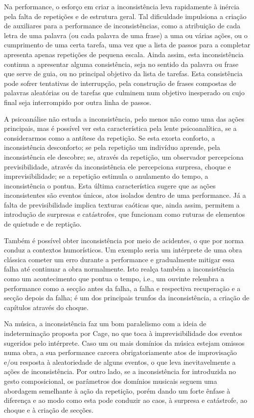\documentclass[../main.tex]{subfiles}
\begin{document}
Na performance, o esforço em criar a inconsistência leva rapidamente à inércia pela falta de repetições e de estrutura geral. Tal dificuldade impulsiona a criação de auxiliares para a performance de inconsistências, como a atribuição de cada letra de uma palavra (ou cada palavra de uma frase) a uma ou várias ações, ou o cumprimento de uma certa tarefa, uma vez que a lista de passos para a completar apresenta apenas repetições de pequena escala. Ainda assim, esta inconsistência continua a apresentar alguma consistência, seja no sentido da palavra ou frase que serve de guia, ou no principal objetivo da lista de tarefas. Esta consistência pode sofrer tentativas de interrupção, pela construção de frases compostas de palavras aleatórias ou de tarefas que culminem num objetivo inesperado ou cujo final seja interrompido por outra linha de passos.

A psicoanálise não estuda a inconsistência, pelo menos não como uma das ações principais, mas é possível ver esta característica pela lente psicoanalítica, se a considerarmos como a antítese da repetição. Se esta exorta conforto, a inconsistência desconforto; se pela repetição um indivíduo aprende, pela inconsistência ele descobre; se, através da repetição, um observador percepciona previsibilidade, através da inconsistência ele percepciona surpresa, choque e imprevisibilidade; se a repetição estimula o anulamento do tempo, a inconsistência o pontua. Esta última característica sugere que as ações inconsistentes são eventos únicos, atos isolados dentro de uma performance. Já a falta de previsibilidade implica texturas caóticas que, ainda assim, permitem a introdução de surpresas e catástrofes, que funcionam como ruturas de elementos de quietude e de reptição.

Também é possível obter inconsistência por meio de acidentes, o que por norma conduz a contextos humorísticos. Um exemplo seria um intérprete de uma obra clássica cometer um erro durante a performance e gradualmente mitigar essa falha até continuar a obra normalmente. Isto realça também a inconsistência como um acontecimento que pontua o tempo, i.e., um ouvinte relembra a performance como a secção antes da falha, a falha e respectiva recuperação e a secção depois da falha; é um dos principais trunfos da inconsistência, a criação de capítulos através do choque.

Na música, a inconsistência faz um bom paralelismo com a ideia de indeterminação proposta por Cage, no que toca à imprevisibilidade dos eventos sugeridos pelo intérprete. Caso um ou mais domínios da música estejam omissos numa obra, a sua performance carcera obrigatoriamente atos de improvisação e/ou resposta à aleatoriedade de alguns eventos, o que leva inevitavelmente a ações de inconsistência. Por outro lado, se a inconsistência for introduzida no gesto composicional, os parâmetros dos domínios musicais seguem uma abordagem semelhante à ação da repetição, porém dando um forte ênfase à diferença e ao modo como esta pode conduzir ao caos, à surpresa e catástrofe, ao choque e à criação de secções.
\end{document}
